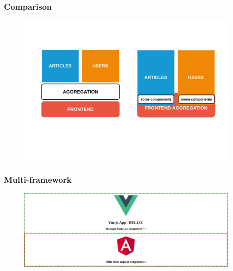 \begin{frame}
\frametitle{Comparison}
\begin{figure}
	\centering
	\includegraphics[width=0.9\linewidth]{pictures/microfrontends-vs-microservices.png}		
	\label{fig:vs}
\end{figure}
\end{frame}

\begin{frame}
	\frametitle{Multi-framework}
	\pause
	\begin{figure}
		\centering
		\includegraphics[width=1
		\linewidth]{pictures/angular-inside-vue}

		\label{fig:angular-inside-vue}
	\end{figure}
	
\end{frame}